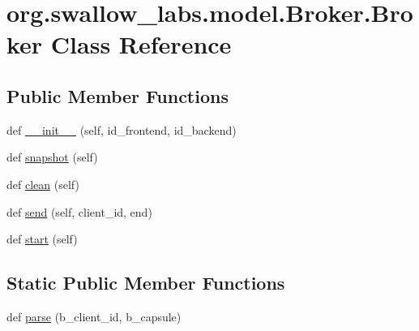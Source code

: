 \hypertarget{classorg_1_1swallow__labs_1_1model_1_1_broker_1_1_broker}{}\section{org.\+swallow\+\_\+labs.\+model.\+Broker.\+Broker Class Reference}
\label{classorg_1_1swallow__labs_1_1model_1_1_broker_1_1_broker}
\subsection*{Public Member Functions}
\begin{DoxyCompactItemize}
\item 
def \hyperlink{classorg_1_1swallow__labs_1_1model_1_1_broker_1_1_broker_a3f870d61e6e574460540aca5099d21bc}{\+\_\+\+\_\+init\+\_\+\+\_\+} (self, id\+\_\+frontend, id\+\_\+backend)
\item 
def \hyperlink{classorg_1_1swallow__labs_1_1model_1_1_broker_1_1_broker_a2f4469e8372d8937c1868eab75fe8bbd}{snapshot} (self)
\item 
def \hyperlink{classorg_1_1swallow__labs_1_1model_1_1_broker_1_1_broker_a4f68c5eb9450d022b7705404071a87fc}{clean} (self)
\item 
def \hyperlink{classorg_1_1swallow__labs_1_1model_1_1_broker_1_1_broker_a05d236fef4af82a508093eb819bed2de}{send} (self, client\+\_\+id, end)
\item 
def \hyperlink{classorg_1_1swallow__labs_1_1model_1_1_broker_1_1_broker_a78f5728fbe5fe8489ad1238ad21d24e3}{start} (self)
\end{DoxyCompactItemize}
\subsection*{Static Public Member Functions}
\begin{DoxyCompactItemize}
\item 
def \hyperlink{classorg_1_1swallow__labs_1_1model_1_1_broker_1_1_broker_ae6ed636aa76d6b9e0002952aeb7ec1f0}{parse} (b\+\_\+client\+\_\+id, b\+\_\+capsule)
\end{DoxyCompactItemize}

